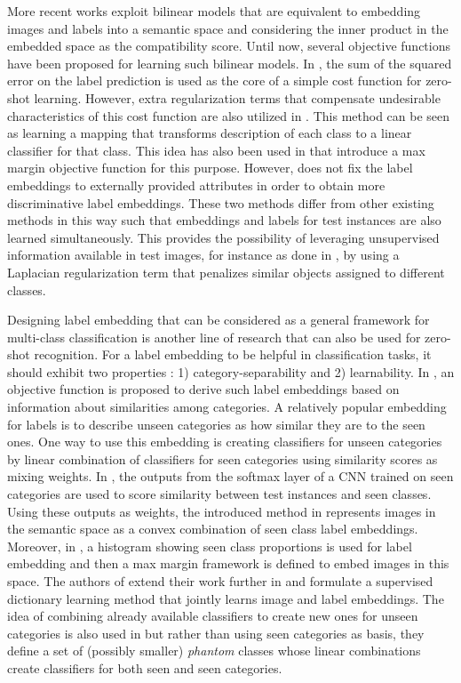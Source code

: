 \documentclass[10pt,twocolumn,letterpaper]{article}
\begin{document}
More recent works exploit bilinear models that are equivalent to embedding images and labels into a semantic space and considering the inner product in the embedded space as the compatibility score. Until now, several objective functions have been proposed for learning such bilinear models.
In \cite{emb15}, the sum of the squared error on the label prediction is used as the core of a simple cost function for zero-shot learning. However, extra regularization terms that compensate undesirable characteristics of this cost function are also utilized in \cite{emb15}. 
This method can be seen as learning a mapping that transforms description of each class to a linear classifier for that class. This idea has also been used in \cite{li15max, semi15} that introduce a max margin objective function for this purpose.
However, \cite{semi15} does not fix the label embeddings to externally provided attributes in order to obtain more discriminative label embeddings. These two methods
differ from other existing methods in this way such that embeddings and labels for test instances are also learned simultaneously. This provides the possibility of
leveraging unsupervised information available in test images, for instance as done in \cite{semi15}, by using a Laplacian regularization term that penalizes similar objects assigned to different classes.

Designing label embedding that can be considered as a general framework for multi-class classification is another line of research that can also be used for zero-shot recognition. For a label embedding to be helpful in classification tasks,
 it should exhibit two properties \cite{Yu2013}: 1) category-separability and 2) learnability. In \cite{Yu2013}, an objective function is proposed to derive such label embeddings based on information about similarities among categories.
A relatively popular embedding for labels is to describe unseen categories as how similar they are to the seen ones.
One way to use this embedding is creating classifiers for unseen categories by linear combination of
classifiers for seen categories using similarity scores as mixing weights.
In \cite{convex}, the outputs from the softmax layer of a CNN trained on seen categories are used to score similarity between test instances and seen classes.
Using these outputs as weights, the introduced method in \cite{convex} represents images in the semantic space as a convex combination of seen class label embeddings.
Moreover, in \cite{sse}, a histogram showing seen class proportions is used for label embedding and then a max margin framework is defined to embed images in this space. The authors of \cite{convex} extend their work further in \cite{agnostic} and formulate a supervised dictionary learning method that jointly learns image and label embeddings.
 The idea of combining already available classifiers to create new ones for unseen categories is also used in \cite{Synthesized}
 but rather than using seen categories as basis, they define a set of (possibly smaller) \textit{phantom} classes whose linear combinations
 create classifiers for both seen and seen categories. 
\end{document}
